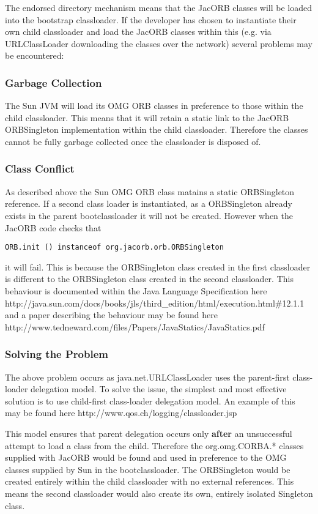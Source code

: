 The endorsed directory mechanism means that the JacORB classes will be loaded
into the bootstrap classloader. If the developer has chosen to instantiate their
own child classloader and load the JacORB classes within this (e.g. via URLClassLoader
downloading the classes over the network) several problems may be encountered:

\subsubsection{Garbage Collection}
The Sun JVM will load its OMG ORB classes in preference to those within the child
classloader. This means that it will retain a static link to the JacORB ORBSingleton
implementation within the child classloader. Therefore the classes cannot be fully garbage
collected once the classloader is disposed of.

\subsubsection{Class Conflict}
As described above the Sun OMG ORB class matains a static ORBSingleton reference. If a second
class loader is instantiated, as a ORBSingleton already exists in the parent bootclassloader
it will not be created. However when the JacORB code checks that

{\tt ORB.init () instanceof org.jacorb.orb.ORBSingleton }

it will fail. This is because the ORBSingleton class created in the first classloader is different
to the ORBSingleton class created in the second classloader. This behaviour is documented within the
Java Language Specification here http://java.sun.com/docs/books/jls/third\_edition/html/execution.html\#12.1.1
and a paper describing the behaviour may be found here http://www.tedneward.com/files/Papers/JavaStatics/JavaStatics.pdf


\subsubsection{Solving the Problem}
The above problem occurs as java.net.URLClassLoader uses the parent-first class-loader delegation model.
To solve the issue, the simplest and most effective solution is to use child-first class-loader delegation
model. An example of this may be found here http://www.qos.ch/logging/classloader.jsp

This model ensures that parent delegation occurs only \textbf{after} an unsuccessful attempt to load a class from
the child. Therefore the org.omg.CORBA.* classes supplied with JacORB would be found and used in preference to
the OMG classes supplied by Sun in the bootclassloader. The ORBSingleton would be created entirely within the child
classloader with no external references. This means the second classloader would also create its own, entirely
isolated Singleton class.
